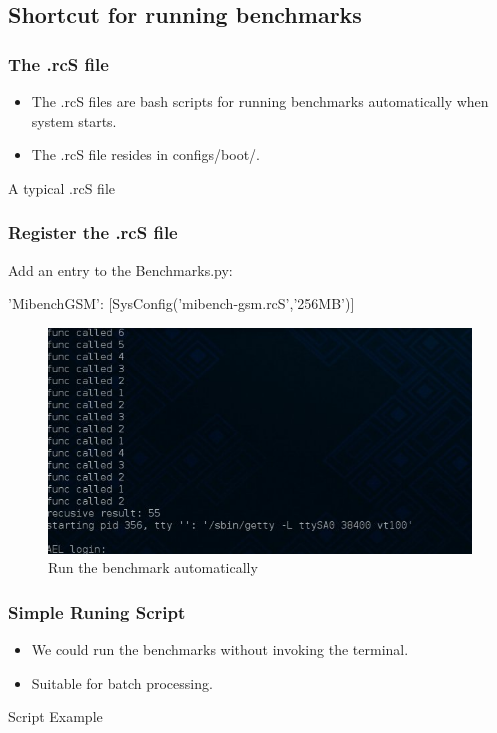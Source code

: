 \documentclass{beamer}
\begin{document}
\subsection{Shortcut for running benchmarks}
\begin{frame}
    \frametitle{The .rcS file}
    \begin{itemize}
    \item
    The .rcS files are bash scripts for running benchmarks automatically when system starts.
    \item
    The .rcS file resides in configs/boot/. 
    \end{itemize}
    \begin{example}{A typical .rcS file}   
	
    \end{example}
\end{frame}
\begin{frame}
    \frametitle{Register the .rcS file}
	Add an entry to the Benchmarks.py: 	
	\begin{example}
	    'MibenchGSM': [SysConfig('mibench-gsm.rcS','256MB')]
    	\end{example}
	\begin{figure}[H]
	    \begin{center}
		\includegraphics[scale=0.5]{back16.jpg}
	    \end{center}
	    \caption{Run the benchmark automatically}
	    \label{fig:runbench}
	\end{figure}
\end{frame}

\begin{frame}
    \frametitle{Simple Runing Script}
    \begin{itemize}
	\item We could run the benchmarks without invoking the terminal. 
	\item Suitable for batch processing.
    \end{itemize}
    \begin{block}{Script Example}
	
    \end{block}
\end{frame}
\end{document}
